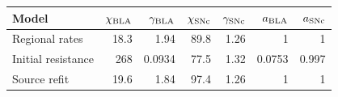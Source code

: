 \begin{tabular}{lrrrrrr}\toprule Model & $\chi_{\rm BLA}$ & $\gamma_{\rm BLA}$ & $\chi_{\rm SNc}$ & $\gamma_{\rm SNc}$ & $a_{\rm BLA}$ & $a_{\rm SNc}$\\\midrule
Regional rates & 18.3 & 1.94 & 89.8 & 1.26 & 1 & 1\\
Initial resistance & 268 & 0.0934 & 77.5 & 1.32 & 0.0753 & 0.997\\
Source refit & 19.6 & 1.84 & 97.4 & 1.26 & 1 & 1\\
\bottomrule\end{tabular}